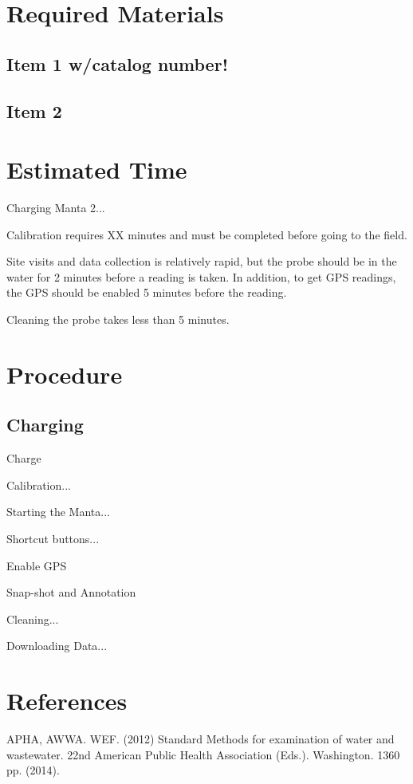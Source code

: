 \documentclass[12pt]{../SOP2}
\begin{document}
\section{Required Materials}

\subsection{Item 1 w/catalog number!}
\subsection{Item 2}

\section{Estimated Time}

\NP Charging Manta 2...

\NP Calibration requires XX minutes and must be completed before going to the field.

\NP Site visits and data collection is relatively rapid, but the probe should be in the water for 2 minutes before a reading is taken. In addition, to get GPS readings, the GPS should be enabled 5 minutes before the reading.

\NP Cleaning the probe takes less than 5 minutes.

\section{Procedure}

\subsection{Charging}

\NP Charge

\NP Calibration...

\NP Starting the Manta...

\NP Shortcut buttons...

\NP Enable GPS

\NP Snap-shot and Annotation

\NP Cleaning...

\NP Downloading Data...

\section{References}

\NP APHA, AWWA. WEF. (2012) Standard Methods for examination of water and wastewater. 22nd American Public Health Association (Eds.). Washington. 1360 pp. (2014).
\end{document}

